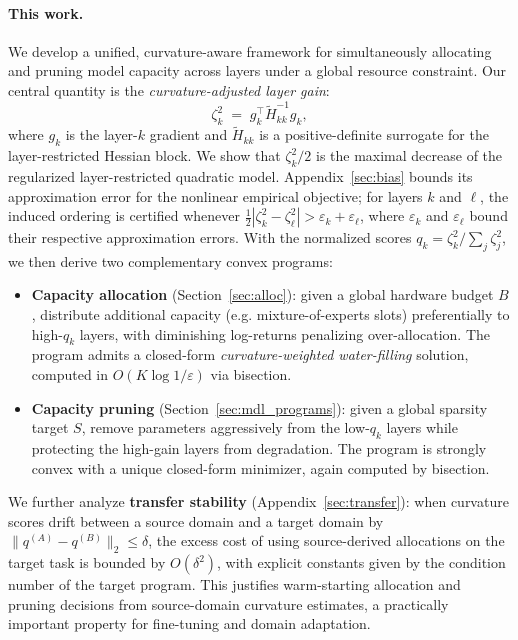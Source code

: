 \documentclass[accepted]{uai2026}%
\theoremstyle{remark}%
\begin{document}
\paragraph{This work.}
We develop a unified, curvature-aware framework for simultaneously
allocating and pruning model capacity across layers under a global
resource constraint.
Our central quantity is the \emph{curvature-adjusted layer gain}:
\[
  \zeta_k^{2}
  \;=\;
  g_k^{\top}\widetilde{H}_{kk}^{-1}g_k,
\]
where $g_k$ is the layer-$k$ gradient and $\widetilde{H}_{kk}$ is a
positive-definite surrogate for the layer-restricted Hessian block.
We show that $\zeta_k^{2}/2$ is the maximal decrease
of the regularized layer-restricted quadratic model. Appendix~\ref{sec:bias}
bounds its approximation error for the nonlinear empirical objective;
for layers $k$ and $\ell$, the induced ordering is certified whenever
$\tfrac12|\zeta_k^2-\zeta_\ell^2|>\varepsilon_k+\varepsilon_\ell$, where
$\varepsilon_k$ and $\varepsilon_\ell$ bound their respective approximation errors.
With the normalized scores $q_k = \zeta_k^2 / \sum_j \zeta_j^2$, we then derive two
complementary convex programs:
\vspace{-1mm}
\begin{itemize}[noitemsep]
  \item \textbf{Capacity allocation} (Section~\ref{sec:alloc}):
    given a global hardware budget $B$, distribute additional capacity
    (e.g. mixture-of-experts slots) preferentially to
    high-$q_k$ layers, with diminishing log-returns penalizing
    over-allocation.
    The program admits a closed-form \emph{curvature-weighted
    water-filling} solution, computed in $O(K\log 1/\varepsilon)$
    via bisection.

  \item \textbf{Capacity pruning} (Section~\ref{sec:mdl_programs}):
    given a global sparsity target $S$, remove parameters
    aggressively from the low-$q_k$ layers while protecting the high-gain
    layers from degradation.
    The program is strongly convex with a unique closed-form minimizer,
    again computed by bisection.
\end{itemize}
\vspace{-2mm}
\noindent
We further analyze \textbf{transfer stability}
(Appendix~\ref{sec:transfer}): when curvature scores drift between a
source domain and a target domain by $\|q^{(A)} - q^{(B)}\|_2 \le \delta$,
the excess cost of using source-derived allocations on the target task
is bounded by $O(\delta^2)$, with explicit constants given by the
condition number of the target program.
This justifies warm-starting allocation and pruning decisions from
source-domain curvature estimates, a practically important property
for fine-tuning and domain adaptation.
\vspace{-2mm}
\end{document}
